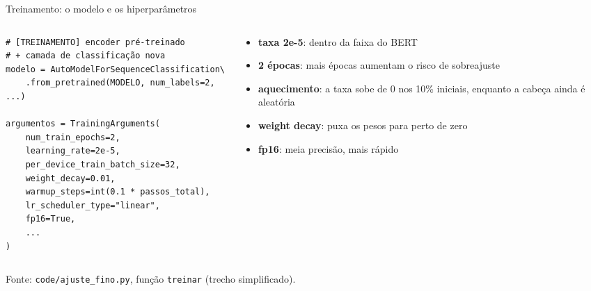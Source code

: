 \documentclass[aspectratio=169,10pt]{beamer}
\newcommand{\fonte}[1]{\par\vfill{\scriptsize\color{tinta2}Fonte: #1}}
\begin{document}
\begin{frame}[fragile]{Treinamento: o modelo e os hiperparâmetros}
  \begin{columns}[T]
    \begin{column}{0.55\textwidth}
      \begin{lstlisting}[basicstyle=\ttfamily\scriptsize]
# [TREINAMENTO] encoder pré-treinado
# + camada de classificação nova
modelo = AutoModelForSequenceClassification\
    .from_pretrained(MODELO, num_labels=2, ...)

argumentos = TrainingArguments(
    num_train_epochs=2,
    learning_rate=2e-5,
    per_device_train_batch_size=32,
    weight_decay=0.01,
    warmup_steps=int(0.1 * passos_total),
    lr_scheduler_type="linear",
    fp16=True,
    ...
)
      \end{lstlisting}
    \end{column}
    \begin{column}{0.42\textwidth}
      \small
      \begin{itemize}
        \item \textbf{taxa 2e-5}: dentro da faixa do BERT
        \item \textbf{2 épocas}: mais épocas aumentam o risco de sobreajuste
        \item \textbf{aquecimento}: a taxa sobe de 0 nos 10\% iniciais, enquanto a cabeça ainda é aleatória
        \item \textbf{weight decay}: puxa os pesos para perto de zero
        \item \textbf{fp16}: meia precisão, mais rápido
      \end{itemize}
    \end{column}
  \end{columns}
  \fonte{\texttt{code/ajuste\_fino.py}, função \texttt{treinar} (trecho simplificado).}
\end{frame}
\end{document}
